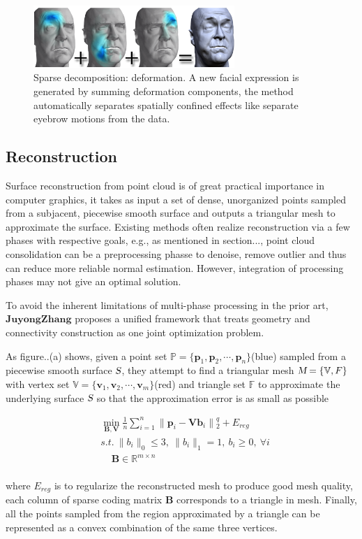 \begin{figure}[ht]
  \centering
  \includegraphics[width=3in]{images/localdefor_learning}
  \caption{Sparse decomposition: deformation\cite{neumann2013sparse}. A new facial expression is generated by summing deformation components, the method automatically separates spatially confined effects like separate eyebrow motions from the data.}
\end{figure}


\subsection{Reconstruction}
Surface reconstruction from point cloud is of great practical importance in computer graphics,
it takes as input a set of dense, unorganized points sampled from a subjacent, piecewise smooth surface and outputs a triangular mesh to approximate the surface.
Existing methods often realize reconstruction via a few phases with respective goals, e.g., as mentioned in section..., point cloud consolidation can be a preprocessing phasse to denoise, remove outlier and thus can reduce more reliable normal estimation.
However, integration of processing phases may not give an optimal solution.

To avoid the inherent limitations of multi-phase processing in the prior art, $\mathbf{Juyong Zhang}$ proposes a unified framework that treats geometry and connectivity construction as one joint optimization problem.

As figure..(a) shows, given a point set $\mathbb{P}=\{ \mathbf{p}_1, \mathbf{p}_2, \cdots, \mathbf{p}_n \}$(blue) sampled from a piecewise smooth surface $\textsl{S}$, 
they attempt to find a triangular mesh $\textsl{M}=\{ \mathbb{V}, \mathbb{}F\}$ with 
vertex set $\mathbb{V}=\{ \mathbf{v}_1, \mathbf{v}_2, \cdots, \mathbf{v}_m \}$(red) and triangle set $\mathbb{F}$ to approximate the underlying surface $\textsl{S}$ so that the approximation error is as small as possible

\small{
\begin{equation}
 \label{eq:dictreconstruction}
 \begin{split}
 & \min_{\mathbf{B},\mathbf{V}}\frac{1}{n}\sum_{i=1}^{n}\|\mathbf{p}_{i}-\mathbf{Vb}_{i}\|{_2^{q}}+E_{reg}\\
 & s.t.~\|b_{i}\|_0\le3,~\|b_{i}\|_1=1,~b_{i}\ge0,~\forall i \\
 & ~~~~~\mathbf{B}\in \mathbb{R}^{m\times n}
 \end{split}
\end{equation}
}
\\
where $E_{reg}$ is to regularize the reconstructed mesh to produce good mesh quality, 
each column of sparse coding matrix $\mathbf{B}$ corresponds to a triangle in mesh. Finally, all the points sampled from the region approximated by a triangle can be represented as a convex combination of the same three vertices.

